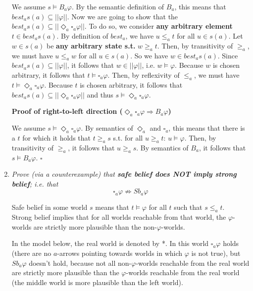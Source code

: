 \documentclass[leqno]{article}
\begin{document}
\begin{enumerate}[label=(\alph*)]
		We assume $s \models B_a \varphi$.
		By the semantic definition of $B_a$, this means that
		$best_a s(a) \subseteq ||\varphi||$.
		Now we are going to show that the
		$best_a s(a) \subseteq ||\Diamond_a \square_a \varphi||$.
		To do so, we consider \textbf{any arbitrary element} $t \in best_a s(a)$.
		By definition of $best_a$, we have $u \le_a t$ for all $u \in s(a)$.
		Let $w \in s(a)$ be \textbf{any arbitrary state s.t.} $w \ge_a t$.
		Then, by transitivity of $\ge_a$, we must have $u \le_a w$ for all
		$u \in s(a)$.
		So we have $w \in best_a s(a)$.
		Since $best_a s(a) \subseteq ||\varphi||$, it follows that
		$w \in ||\varphi||$, i.e. $w \models \varphi$.
		Because $w$ is chosen arbitrary, it follows that
		$t \models \square_a \varphi$.
		Then, by reflexivity of $\le_a$, we must have
		$t \models \Diamond_a \square_a \varphi$.
		Because $t$ is chosen arbitrary, it follows that
		$best_a s(a) \subseteq ||\Diamond_a \square_a \varphi||$ and thus
		$s \models \Diamond_a \square_a \varphi$.

		\textbf{Proof of right-to-left direction
		($\Diamond_a \square_a \varphi \Rightarrow B_a \varphi$)}

 		We assume $s \models \Diamond_a \square_a \varphi$.
 		By semantics of $\Diamond_a$ and $\square_a$, this means that there is a
 		$t$ for which it holds that $t \ge_a s$ s.t. for all
 		$u \ge_a t$: $u \models \varphi$.
 		Then, by transitivity of $\ge_a$, it follows that $u \ge_a s$.
 		By semantics of $B_a$, it follows that $s \models B_a \varphi$.
		\hfill $\square$

	\item \textit{Prove (via a counterexample) that \textbf{safe belief does NOT
		imply strong belief}; i.e. that}
		$$\square_a \varphi \not\Rightarrow Sb_a \varphi$$

        Safe belief in some world $s$ means that $t \models \varphi$ for all $t$ such that
        $s \leq_a t$.\\
        Strong belief implies that for all worlds reachable from that world,
        the $\varphi$-worlds are strictly more plausible than the
        non-$\varphi$-worlds.

        In the model below, the real world is denoted by *. In this world
        $\square_a \varphi$ holds (there are no $a$-arrows pointing towards
        worlds in which $\varphi$ is not true), but $Sb_a \varphi$ doesn't hold,
         because not all non-$\varphi$-worlds reachable from the real world are
          strictly more plausible than the $\varphi$-worlds reachable from the
         real world (the middle world is more plausible than the left world).


\end{enumerate}
\end{document}
